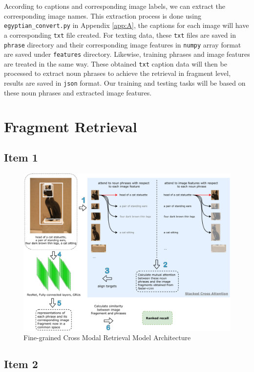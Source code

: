 According to captions and corresponding image labels, we can extract the corresponding image names. This extraction process is done using \verb|egyptian_convert.py| in Appendix \ref{app:A}, the captions for each image will have a corresponding \verb|txt| file created. For texting data, these \verb|txt| files are saved in \verb|phrase| directory and their corresponding image features in \verb|numpy| array format are saved under \verb|features| directory. Likewise, training phrases and image features are treated in the same way. These obtained \verb|txt| caption data will then be processed to extract noun phrases to achieve the retrieval in fragment level, results are saved in \verb|json| format. Our training and testing tasks will be based on these noun phrases and extracted image features.

\section{Fragment Retrieval}
\subsection{Item 1}

\begin{figure}[h!]
\centering
\includegraphics[width=\textwidth]{archi.pdf}
\caption{Fine-grained Cross Modal Retrieval Model Architecture}
\label{fig:mainarch}
\end{figure}

\subsection{Item 2}

